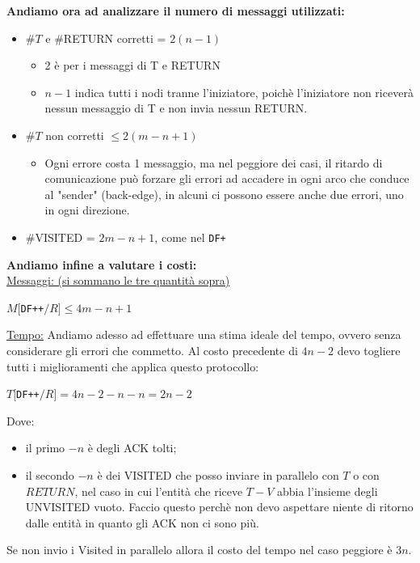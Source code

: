 \textbf{Andiamo ora ad analizzare il numero di messaggi utilizzati:}
\begin{itemize}
  \item \#$T$ e \#RETURN corretti = $2(n-1)$ 
  \begin{itemize}
      \item 2 è per i messaggi di T e RETURN
      \item $n-1$ indica tutti i nodi tranne l'iniziatore, poichè l'iniziatore non riceverà nessun messaggio di T e non invia nessun RETURN.
  \end{itemize}
  \item \#$T$ non corretti $\leq 2(m-n+1)$
  \begin{itemize}
      \item Ogni errore costa 1 messaggio, ma nel peggiore dei casi, il ritardo di comunicazione può forzare gli errori ad accadere in ogni arco che conduce al "sender" (back-edge), in alcuni ci possono essere anche due errori, uno in ogni direzione.
      
      
  \end{itemize}
  
  \item \#VISITED = $2m - n + 1$, come nel \texttt{DF+}
  
\end{itemize}

\textbf{Andiamo infine a valutare i costi: }\\
\underline{Messaggi: (si sommano le tre quantità sopra)}
\begin{center}
  $M[$\texttt{DF++}$/R] \leq 4m - n + 1$
\end{center}

\underline{Tempo:}
Andiamo adesso ad effettuare una stima ideale del tempo, ovvero senza considerare gli errori che commetto. Al costo precedente di $4n-2$ devo togliere tutti i miglioramenti che applica questo protocollo:
\begin{center}
  $T[$\texttt{DF++}$/R] = 4n - 2 - n - n = 2n - 2$
\end{center}

Dove:
\begin{itemize}
  \item il primo $-n$ è degli ACK tolti;
  \item il secondo $-n$ è dei VISITED che posso inviare in parallelo con $T$ o con $RETURN$, nel caso in cui l'entità che riceve $T-V$ abbia l'insieme degli UNVISITED vuoto. Faccio questo perchè non devo aspettare niente di ritorno dalle entità in quanto gli ACK non ci sono più. 
\end{itemize}
Se non invio i Visited in parallelo allora il costo del tempo nel caso peggiore è $3n$.

